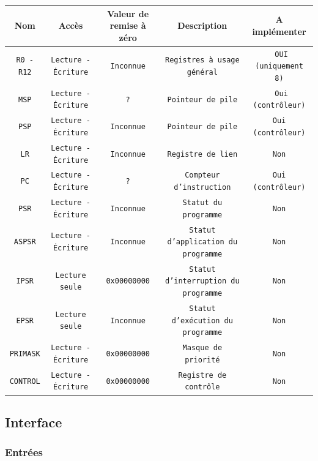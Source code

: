 \begin{tabular}{|c|c|c|c|c|}
\hline
\textbf{Nom} 	 & \textbf{Accès}              & \textbf{Valeur de remise à zéro} & \textbf{Description} & \textbf{A implémenter}\\
\hline
\texttt{R0 - R12} &  \texttt{Lecture - Écriture} &  \texttt{Inconnue}		  &  \texttt{Registres à usage général} &  \texttt{ OUI (uniquement 8)}\\
\hline
\texttt{MSP} 	 &  \texttt{Lecture - Écriture} &  \texttt{?} 			  &  \texttt{Pointeur de pile} &  \texttt{ Oui (contrôleur)}\\
\hline
\texttt{PSP}	 &  \texttt{Lecture - Écriture} &  \texttt{Inconnue} 		  &  \texttt{Pointeur de pile} &  \texttt{Oui (contrôleur)}\\
\hline
\texttt{LR} 	 &  \texttt{Lecture - Écriture} &  \texttt{Inconnue} 		  &  \texttt{Registre de lien} &  \texttt{Non}\\
\hline
\texttt{PC} 	 &  \texttt{Lecture - Écriture} &  \texttt{?} 			  &  \texttt{Compteur d'instruction} &  \texttt{Oui (contrôleur)}\\
\hline
\texttt{PSR} 	 &  \texttt{Lecture - Écriture} &  \texttt{Inconnue} 		  &  \texttt{Statut du programme} &  \texttt{Non}\\
\hline
\texttt{ASPSR} 	 &  \texttt{Lecture - Écriture} &  \texttt{Inconnue} 		  &  \texttt{Statut d'application du programme} &  \texttt{Non}\\
\hline
\texttt{IPSR} 	 &  \texttt{Lecture seule}      &  \texttt{0x00000000} 		  &  \texttt{Statut d'interruption du programme} &  \texttt{Non}\\
\hline
\texttt{EPSR} 	 &  \texttt{Lecture seule}      &  \texttt{Inconnue} 		  &  \texttt{Statut d'exécution du programme} &  \texttt{Non}\\
\hline
\texttt{PRIMASK}  &  \texttt{Lecture - Écriture} &  \texttt{0x00000000} 		  &  \texttt{Masque de priorité} &  \texttt{Non}\\
\hline
\texttt{CONTROL}  &  \texttt{Lecture - Écriture} &  \texttt{0x00000000} 		  &  \texttt{Registre de contrôle} &  \texttt{Non}\\
\hline
\end{tabular}

\subsection{Interface}

\subsubsection{Entrées}

